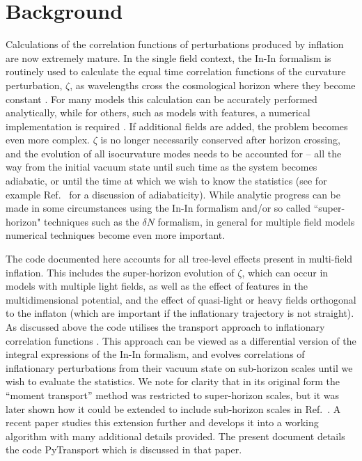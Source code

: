 \documentclass[10pt,
amsmath,amssymb,
aps,prd,nofootinbib,eqsecnum,a4paper]{revtex4}
\begin{document}
\section{Background} 

Calculations of the correlation functions of perturbations produced by inflation 
are now extremely mature.
In the single field context, the In-In formalism is routinely used to calculate the equal time correlation 
functions of the 
curvature perturbation, $\zeta$, as wavelengths cross the cosmological horizon 
\cite{Maldacena:2002vr, Seery:2005wm, Chen:2006nt,Elliston:2012ab} where they become 
constant \cite{Rigopoulos:2003ak,Lyth:2004gb}. 
For many models this calculation can be accurately performed 
analytically, while for others, such as models with features, 
a numerical implementation is required \cite{Chen:2006xjb,Chen:2008wn,Hazra:2012yn,Funakoshi:2012ms}. 
If additional fields are added, the problem becomes even more complex. $\zeta$ is no longer 
necessarily conserved after horizon crossing, and the evolution of all 
isocurvature modes needs to be accounted for --    
all the way from the initial vacuum state until such time as the system becomes adiabatic, or until the time at which we wish to know the statistics  (see for example Ref.~\cite{Elliston:2011dr} 
for a discussion of adiabaticity). While analytic progress can be made in some circumstances 
using the In-In formalism and/or so called ``super-horizon" techniques such as the $\delta N$ formalism, 
in general for multiple field models numerical techniques become even more important. 

The code documented here accounts for all tree-level effects present in multi-field inflation. This includes  
the super-horizon evolution of $\zeta$, which 
can occur in models with multiple light  
fields, as well as the effect of features in the multidimensional potential, and the effect of 
quasi-light or heavy fields orthogonal to the inflaton 
(which are important if the inflationary trajectory is not straight).
As discussed above the code utilises the transport approach to inflationary correlation functions 
\cite{Mulryne:2009kh,Mulryne:2010rp,Dias:2011xy,Anderson:2012em,Seery:2012vj, Mulryne:2013uka}. This approach 
can be viewed as a differential version of the integral expressions of the In-In formalism, 
and evolves correlations of inflationary perturbations from their vacuum state on 
sub-horizon scales until we wish to evaluate the statistics. 
We note for clarity that in its original form the ``moment transport'' method was restricted 
to super-horizon scales, but it was later shown how it could be extended to include sub-horizon scales 
in Ref.~\cite{Mulryne:2013uka}. A recent paper studies this extension further and develops it into a working 
algorithm \cite{xxx} with many additional details provided. The present document details 
the code PyTransport which is discussed in that paper.
\end{document}
